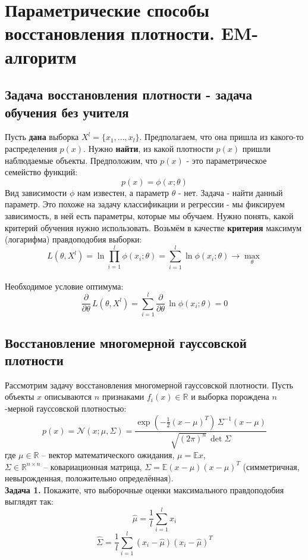 \section{Параметрические способы восстановления плотности. EM-алгоритм}
\subsection{Задача восстановления плотности - задача обучения без учителя}

Пусть \textbf{дана} выборка $X^l = \{x_1,...,x_l\}$. Предполагаем, что она пришла из какого-то распределения $p(x)$. Нужно \textbf{найти}, из какой плотности  $p(x)$ пришли наблюдаемые объекты. Предположим, что $p(x)$ - это параметрическое семейство функций:
$$p(x) = \phi(x;\theta)$$
Вид зависимости $\phi$ нам известен, а параметр $\theta$ - нет. Задача - найти данный параметр. 
Это похоже на задачу классификации и регрессии - мы фиксируем зависимость, в ней есть параметры, которые мы обучаем. 
Нужно понять, какой критерий обучения нужно использовать.
Возьмём в качестве \textbf{критерия} максимум (логарифма) правдоподобия выборки:
$$L(\theta, X^l) = \ln \prod_{i=1}^l \phi(x_i; \theta) = \sum_{i=1}^l \ln \phi(x_i;\theta) \to \max_\theta $$
\\
Необходимое условие оптимума:
$$\frac{\partial}{\partial \theta} \, L(\theta, X^l) = \sum_{i=1}^l \frac{\partial}{\partial \theta}\,  \ln \phi(x_i;\theta) = 0$$
\subsection{Восстановление многомерной гауссовской плотности}
Рассмотрим задачу восстановления многомерной гауссовской плотности. 
Пусть объекты $x$ описываются $n$ признаками $f_i(x)\in \mathbb{R}$ и выборка порождена $n$-мерной гауссовской плотностью:
$$p(x) = \mathcal{N}(x;\mu,\Sigma) = \frac{\exp(-\frac{1}{2}(x-\mu)^T)\,\Sigma^{-1}(x-\mu)}{\sqrt{(2\pi)^n}\,\det \Sigma}$$
где $\mu\in \mathbb{R}$ -- вектор математического ожидания, $\mu=\mathbb{E}x$,\\ $\Sigma \in \mathbb{R}^{n\times n}$ -- ковариационная матрица, $\Sigma = \mathbb{E}(x-\mu)(x-\mu)^T$ (симметричная, невырожденная, положительно определённая).
\\[\bigskipamount]
\textbf{Задача 1.} Покажите, что выборочные оценки максимального правдоподобия выглядят так:
$$\hat{\mu} = \frac{1}{l} \sum_{i=1}^l x_i$$
$$\hat{\Sigma} = \frac{1}{l}\sum_{i=1}^l (x_i - \hat{\mu})(x_i - \hat{\mu})^T$$
\\[\bigskipamount]

